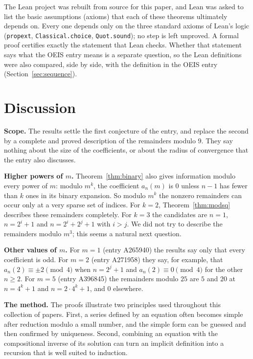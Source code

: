 \documentclass[11pt,a4paper]{article}
\theoremstyle{definition}
\theoremstyle{remark}
\newcommand{\para}[1]{\par\medskip\noindent\textbf{#1}\enspace}
\begin{document}
The Lean project was rebuilt from source for this paper, and Lean was asked to list the basic assumptions (axioms)
that each of these theorems ultimately depends on. Every one depends only on the three standard axioms of Lean's logic
(\texttt{propext}, \texttt{Classical.choice}, \texttt{Quot.sound}); no step is left unproved. A formal proof certifies
exactly the statement that Lean checks. Whether that statement says what the OEIS entry means is a separate question,
so the Lean definitions were also compared, side by side, with the definition in the OEIS entry
(Section~\ref{sec:sequence}).

\section{Discussion}\label{sec:discussion}

\para{Scope.} The results settle the first conjecture of the entry, and replace the second by a complete and proved
description of the remainders modulo $9$. They say nothing about the size of the coefficients, or about the radius of
convergence that the entry also discusses.

\para{Higher powers of $m$.} Theorem~\ref{thm:binary} also gives information modulo every power of $m$: modulo
$m^k$, the coefficient $a_n(m)$ is $0$ unless $n-1$ has fewer than $k$ ones in its binary expansion. So modulo $m^k$
the nonzero remainders can occur only at a very sparse set of indices. For $k=2$, Theorem~\ref{thm:modsq} describes these
remainders completely. For $k=3$ the candidates are $n=1$, $n=2^i+1$ and $n=2^i+2^j+1$ with $i>j$. We did not try to
describe the remainders modulo $m^3$; this seems a natural next question.

\para{Other values of $m$.} For $m=1$ (entry A265940) the results say only that every coefficient is odd. For $m=2$
(entry A271958) they say, for example, that $a_n(2)\equiv\pm2\pmod 4$ when $n=2^j+1$ and $a_n(2)\equiv0\pmod4$ for the
other $n\ge2$. For $m=5$ (entry A396845) the remainders modulo $25$ are $5$ and $20$ at $n=4^k+1$ and $n=2\cdot4^k+1$,
and $0$ elsewhere.


\para{The method.} The proofs illustrate two principles used throughout this collection of papers. First, a series
defined by an equation often becomes simple after reduction modulo a small number, and the simple form can be guessed
and then confirmed by uniqueness. Second, combining an equation with the compositional inverse of its solution can
turn an implicit definition into a recursion that is well suited to induction.
\end{document}
